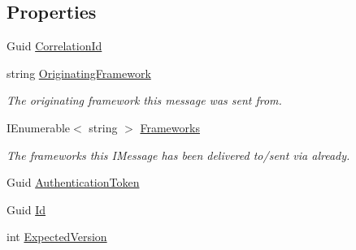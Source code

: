 \subsection*{Properties}
\begin{DoxyCompactItemize}
\item 
Guid \hyperlink{classCqrs_1_1Akka_1_1Tests_1_1Unit_1_1Commands_1_1UpdateCompletedConversationReportCommand_a31a479ec0cf27ea2989c371f51257136_a31a479ec0cf27ea2989c371f51257136}{Correlation\+Id}
\item 
string \hyperlink{classCqrs_1_1Akka_1_1Tests_1_1Unit_1_1Commands_1_1UpdateCompletedConversationReportCommand_a5f954bf75f49918ab48c3a09df50111f_a5f954bf75f49918ab48c3a09df50111f}{Originating\+Framework}
\begin{DoxyCompactList}\small\item\em The originating framework this message was sent from. \end{DoxyCompactList}\item 
I\+Enumerable$<$ string $>$ \hyperlink{classCqrs_1_1Akka_1_1Tests_1_1Unit_1_1Commands_1_1UpdateCompletedConversationReportCommand_a8074ae409596c6e5d46e363adbfb9354_a8074ae409596c6e5d46e363adbfb9354}{Frameworks}
\begin{DoxyCompactList}\small\item\em The frameworks this I\+Message has been delivered to/sent via already. \end{DoxyCompactList}\item 
Guid \hyperlink{classCqrs_1_1Akka_1_1Tests_1_1Unit_1_1Commands_1_1UpdateCompletedConversationReportCommand_acd3a75723758c361da638f40fab6d574_acd3a75723758c361da638f40fab6d574}{Authentication\+Token}
\item 
Guid \hyperlink{classCqrs_1_1Akka_1_1Tests_1_1Unit_1_1Commands_1_1UpdateCompletedConversationReportCommand_ae04217f6bfc19727e462f0077b990b34_ae04217f6bfc19727e462f0077b990b34}{Id}
\item 
int \hyperlink{classCqrs_1_1Akka_1_1Tests_1_1Unit_1_1Commands_1_1UpdateCompletedConversationReportCommand_a9e691733ed2512c198da8ad934bd79cb_a9e691733ed2512c198da8ad934bd79cb}{Expected\+Version}
\end{DoxyCompactItemize}


